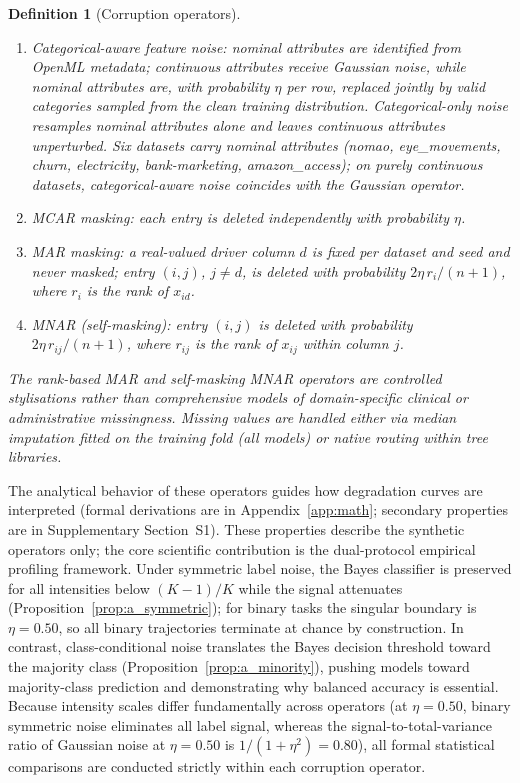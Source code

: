 \documentclass[pdflatex,sn-mathphys]{sn-jnl}
\theoremstyle{thmstyleone}
\theoremstyle{thmstyletwo}
\theoremstyle{thmstylethree}
\newtheorem{definition}{Definition}
\begin{document}
\begin{definition}[Corruption operators]
\begin{enumerate}
\item \emph{Categorical-aware feature noise}: nominal attributes are identified from OpenML metadata; continuous attributes receive Gaussian noise, while nominal attributes are, with probability $\eta$ per row, replaced jointly by valid categories sampled from the clean training distribution. \emph{Categorical-only noise} resamples nominal attributes alone and leaves continuous attributes unperturbed. Six datasets carry nominal attributes (nomao, eye\_movements, churn, electricity, bank-marketing, amazon\_access); on purely continuous datasets, categorical-aware noise coincides with the Gaussian operator.
\item \emph{MCAR masking}: each entry is deleted independently with probability $\eta$.
\item \emph{MAR masking}: a real-valued driver column $d$ is fixed per dataset and seed and never masked; entry $(i,j)$, $j\neq d$, is deleted with probability $2\eta\,r_i/(n+1)$, where $r_i$ is the rank of $x_{id}$.
\item \emph{MNAR (self-masking)}: entry $(i,j)$ is deleted with probability $2\eta\,r_{ij}/(n+1)$, where $r_{ij}$ is the rank of $x_{ij}$ within column $j$.
\end{enumerate}
The rank-based MAR and self-masking MNAR operators are controlled stylisations rather than comprehensive models of domain-specific clinical or administrative missingness. Missing values are handled either via median imputation fitted on the training fold (all models) or native routing within tree libraries.
\end{definition}

The analytical behavior of these operators guides how degradation curves are interpreted (formal derivations are in Appendix~\ref{app:math}; secondary properties are in Supplementary Section~S1). These properties describe the synthetic operators only; the core scientific contribution is the dual-protocol empirical profiling framework. Under symmetric label noise, the Bayes classifier is preserved for all intensities below $(K-1)/K$ while the signal attenuates (Proposition~\ref{prop:a_symmetric}); for binary tasks the singular boundary is $\eta=0.50$, so all binary trajectories terminate at chance by construction. In contrast, class-conditional noise translates the Bayes decision threshold toward the majority class (Proposition~\ref{prop:a_minority}), pushing models toward majority-class prediction and demonstrating why balanced accuracy is essential. Because intensity scales differ fundamentally across operators (at $\eta=0.50$, binary symmetric noise eliminates all label signal, whereas the signal-to-total-variance ratio of Gaussian noise at $\eta=0.50$ is $1/(1+\eta^2)=0.80$), all formal statistical comparisons are conducted strictly within each corruption operator.
\end{document}
